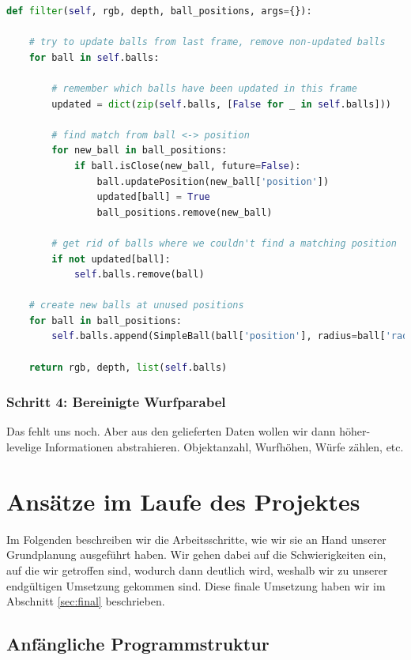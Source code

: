 \documentclass[12pt,a4paper,ngerman]{scrartcl}
\begin{document}
\begin{lstlisting}[language=Python,caption={\lstinline{SimpleHandBall.py}, Ausschnitt}]
def filter(self, rgb, depth, ball_positions, args={}):

    # try to update balls from last frame, remove non-updated balls
    for ball in self.balls:

        # remember which balls have been updated in this frame
        updated = dict(zip(self.balls, [False for _ in self.balls]))

        # find match from ball <-> position
        for new_ball in ball_positions:
            if ball.isClose(new_ball, future=False):
                ball.updatePosition(new_ball['position'])
                updated[ball] = True
                ball_positions.remove(new_ball)

        # get rid of balls where we couldn't find a matching position
        if not updated[ball]:
            self.balls.remove(ball)

    # create new balls at unused positions
    for ball in ball_positions:
        self.balls.append(SimpleBall(ball['position'], radius=ball['radius']))

    return rgb, depth, list(self.balls)
\end{lstlisting}
        



\subsubsection{Schritt 4: Bereinigte Wurfparabel}

Das fehlt uns noch. Aber aus den gelieferten Daten wollen wir dann höher-levelige Informationen abstrahieren. Objektanzahl, Wurfhöhen, Würfe zählen, etc.




\section{Ansätze im Laufe des Projektes}
\label{sec:ansaetze}

Im Folgenden beschreiben wir die Arbeitsschritte, wie wir sie an Hand unserer
Grundplanung ausgeführt haben. Wir gehen dabei auf die Schwierigkeiten ein, auf die
wir getroffen sind, wodurch dann deutlich wird, weshalb wir zu unserer endgültigen
Umsetzung gekommen sind. Diese finale Umsetzung haben wir im Abschnitt \ref{sec:final} beschrieben.

\subsection{Anfängliche Programmstruktur}
\end{document}
